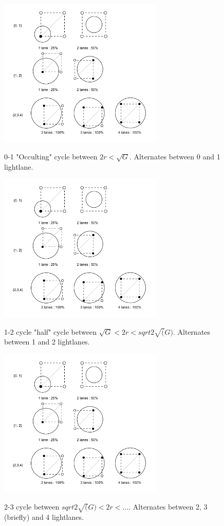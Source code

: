 \documentclass[notitlepage]{article}
\begin{document}
\begin{figure}
\centering
{\includegraphics[width=0.7\textwidth, trim={0cm 12cm 0cm 0cm},clip]{illustrations/SimpleGridRatio1.pdf}}
\caption{ 0-1 "Occulting" cycle between $ 2r < \sqrt{G}  $. Alternates between 0 and 1 lightlane.   }\label{fig:OccultingTwinkler}
\vspace*{0.5in}
{\includegraphics[width=0.7\textwidth, trim={0cm 6cm 0cm 5cm},clip]{illustrations/SimpleGridRatio1.pdf}}
\caption{ 1-2 cycle "half" cycle between $  \sqrt{G} < 2r < sqrt{2}\sqrt(G) $. Alternates between 1 and 2 lightlanes.}\label{fig:12cycle}
\vspace*{0.5in}
{\includegraphics[width=0.7\textwidth, trim={0cm 0cm 0cm 10cm},clip]{illustrations/SimpleGridRatio1.pdf}}
\caption{ 2-3 cycle between $  sqrt{2}\sqrt(G) < 2r < ... $. Alternates between 2, 3 (briefly) and 4 lightlanes.}\label{fig:12cycle}



\end{figure}
\end{document}
